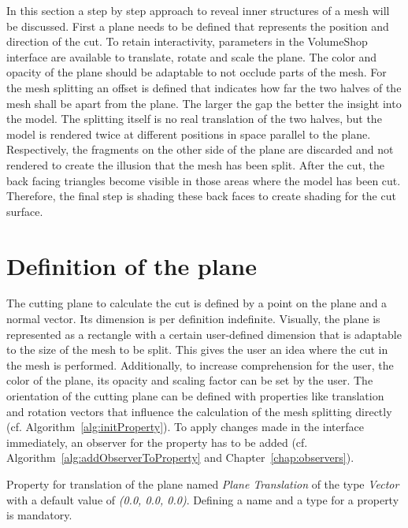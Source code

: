 
In this section a step by step approach to reveal inner structures of a mesh will be discussed. First a plane needs to be defined that represents the position and direction of the cut. To retain interactivity, parameters in the VolumeShop interface are available to translate, rotate and scale the plane. The color and opacity of the plane should be adaptable to not occlude parts of the mesh. For the mesh splitting an offset is defined that indicates how far the two halves of the mesh shall be apart from the plane. The larger the gap the better the insight into the model. The splitting itself is no real translation of the two halves, but the model is rendered twice at different positions in space parallel to the plane. Respectively, the fragments on the other side of the plane are discarded and not rendered to create the illusion that the mesh has been split. After the cut, the back facing triangles become visible in those areas where the model has been cut. Therefore, the final step is shading these back faces to create shading for the cut surface.

\section{Definition of the plane}
\label{chap:planeDefinition}
The cutting plane to calculate the cut is defined by a point on the plane and a normal vector. Its dimension is per definition indefinite. Visually, the plane is represented as a rectangle with a certain user-defined dimension that is adaptable to the size of the mesh to be split. This gives the user an idea where the cut in the mesh is performed. Additionally, to increase comprehension for the user, the color of the plane, its opacity and scaling factor can be set by the user. The orientation of the cutting plane can be defined with properties like translation and rotation vectors that influence the calculation of the mesh splitting directly (cf. Algorithm~\ref{alg:initProperty}). To apply changes made in the interface immediately, an observer for the property has to be added (cf. Algorithm~\ref{alg:addObserverToProperty} and Chapter~\ref{chap:observers}).
\begin{algorithm}
\;
\BlankLine
\caption{Property for translation of the plane named \emph{Plane Translation} of the type \emph{Vector} with a default value of \emph{(0.0, 0.0, 0.0)}. Defining a name and a type for a property is mandatory.}
\label{alg:initProperty}
\end{algorithm}


